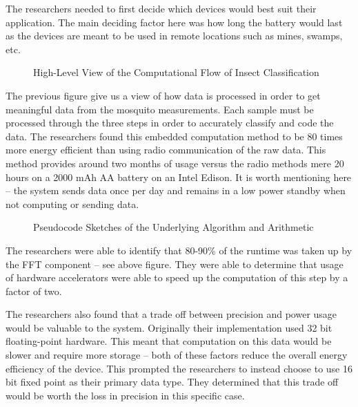 \documentclass{sig-alternate}
\begin{document}
The researchers needed to first decide which devices would best suit their application. The main deciding factor here was how long the battery would last as the devices are meant to be used in remote locations such as mines, swamps, etc.


\begin{figure}
\centering
{}
\caption{High-Level View of the Computational Flow of Insect Classification}
\label{fig:singleColumnFigure1}
\end{figure}

The previous figure give us a view of how data is processed in order to get meaningful data from the mosquito measurements. Each sample must be processed through the three steps in order to accurately classify and code the data. The researchers found this embedded computation method to be 80 times more energy efficient than using radio communication of the raw data. This method provides around two months of usage versus the radio methods mere 20 hours on a 2000 mAh AA battery on an Intel Edison. It is worth mentioning here -- the system sends data once per day and remains in a low power standby when not computing or sending data.


\begin{figure*}
\centering
{}
\caption{Pseudocode Sketches of the Underlying Algorithm and Arithmetic}
\label{fig:twoColumnFigure1}
\end{figure*}

The researchers were able to identify that 80-90\% of the runtime was taken up by the FFT component -- see above figure. They were able to determine that usage of hardware accelerators were able to speed up the computation of this step by a factor of two.

The researchers also found that a trade off between precision and power usage would be valuable to the system. Originally their implementation used 32 bit floating-point hardware. This meant that computation on this data would be slower and require more storage -- both of these factors reduce the overall energy efficiency of the device. This prompted the researchers to instead choose to use 16 bit fixed point as their primary data type. They determined that this trade off would be worth the loss in precision in this specific case.
\end{document}
